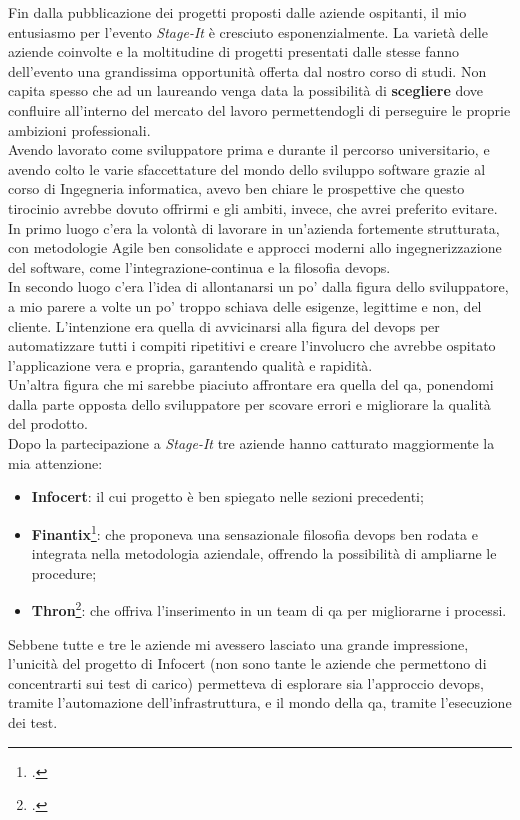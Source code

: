 Fin dalla pubblicazione dei progetti proposti dalle aziende ospitanti, il mio entusiasmo per l'evento \textit{Stage-It} è cresciuto esponenzialmente. La varietà delle aziende coinvolte e la moltitudine di progetti presentati dalle stesse fanno dell'evento una grandissima opportunità offerta dal nostro corso di studi. Non capita spesso che ad un laureando venga data la possibilità di \textbf{scegliere} dove confluire all'interno del mercato del lavoro permettendogli di perseguire le proprie ambizioni professionali.\\
Avendo lavorato come sviluppatore prima e durante il percorso universitario, e avendo colto le varie sfaccettature del mondo dello sviluppo software grazie al corso di Ingegneria informatica, avevo ben chiare le prospettive che questo tirocinio avrebbe dovuto offrirmi e gli ambiti, invece, che avrei preferito evitare. \\
In primo luogo c'era la volontà di lavorare in un'azienda fortemente strutturata, con metodologie Agile ben consolidate e approcci moderni allo ingegnerizzazione del software, come l'\gls{integrazione-continua} e la filosofia \gls{devops}.\\
In secondo luogo c'era l'idea di allontanarsi un po' dalla figura dello sviluppatore, a mio parere a volte un po' troppo schiava delle esigenze, legittime e non, del cliente. L'intenzione era quella di avvicinarsi alla figura del \gls{devops} per automatizzare tutti i compiti ripetitivi e creare l'involucro che avrebbe ospitato l'applicazione vera e propria, garantendo qualità e rapidità.\\
Un'altra figura che mi sarebbe piaciuto affrontare era quella del \gls{qa}, ponendomi dalla parte opposta dello sviluppatore per scovare errori e migliorare la qualità del prodotto. \\
Dopo la partecipazione a \textit{Stage-It} tre aziende hanno catturato maggiormente la mia attenzione: 
\begin{itemize}
	\item \textbf{Infocert}: il cui progetto è ben spiegato nelle sezioni precedenti;
	\item \textbf{Finantix}\footcite{site:finantix}: che proponeva una sensazionale filosofia \gls{devops} ben rodata e integrata nella metodologia aziendale, offrendo la possibilità di ampliarne le procedure;
	\item \textbf{Thron}\footcite{site:thron}: che offriva l'inserimento in un team di \gls{qa} per migliorarne i processi.
\end{itemize}
Sebbene tutte e tre le aziende mi avessero lasciato una grande impressione, l'unicità del progetto di Infocert (non sono tante le aziende che permettono di concentrarti sui test di carico) permetteva di esplorare sia l'approccio \gls{devops}, tramite l'automazione dell'infrastruttura, e il mondo della \gls{qa}, tramite l'esecuzione dei test.
